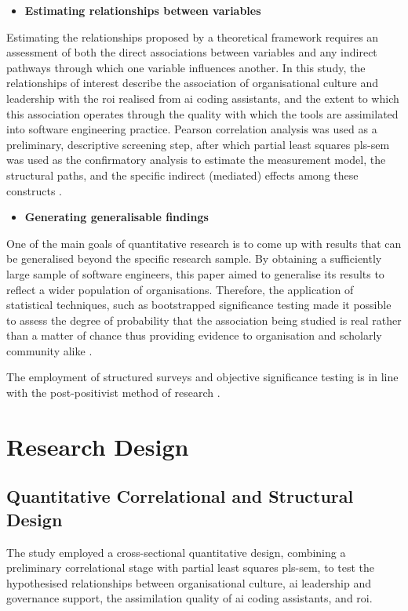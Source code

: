 \begin{itemize}
	\item \textbf{Estimating relationships between variables}
\end{itemize}
Estimating the relationships proposed by a theoretical framework requires an assessment of both the direct associations between variables and any indirect pathways through which one variable influences another. In this study, the relationships of interest describe the association of organisational culture and leadership with the \gls{roi} realised from \gls{ai} coding assistants, and the extent to which this association operates through the quality with which the tools are assimilated into software engineering practice. Pearson correlation analysis was used as a preliminary, descriptive screening step, after which partial least squares \gls{pls-sem} was used as the confirmatory analysis to estimate the measurement model, the structural paths, and the specific indirect (mediated) effects among these constructs \autocite{Hair2019}.

\begin{itemize}
	\item \textbf{Generating generalisable findings}
\end{itemize}
One of the main goals of quantitative research is to come up with results that can be generalised beyond the specific research sample. By obtaining a sufficiently large sample of software engineers, this paper aimed to generalise its results to reflect a wider population of organisations. Therefore, the application of statistical techniques, such as bootstrapped significance testing made it possible to assess the degree of probability that the association being studied is real rather than a matter of chance thus providing evidence to organisation and scholarly community alike \autocite{Bryman2016}.

The employment of structured surveys and objective significance testing is in line with the post-positivist method of research \autocite{Hair2019}.

\section{Research Design}
\label{sec:Research Design}
\subsection{Quantitative Correlational and Structural Design}
\label{sec:Quantitative Correlational and Structural Design}
The study employed a cross-sectional quantitative design, combining a preliminary correlational stage with partial least squares \gls{pls-sem}, to test the hypothesised relationships between organisational culture, \gls{ai} leadership and governance support, the assimilation quality of \gls{ai} coding assistants, and \gls{roi}.

